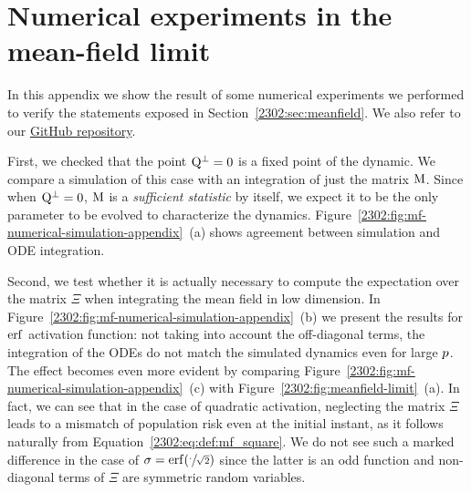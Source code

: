 \section{Numerical experiments in the mean-field limit}

\label{2302:sec:app:numerics-mean-field}
In this appendix we show the result of some numerical experiments we performed to verify the statements exposed in Section~\ref{2302:sec:meanfield}.  We also refer to our \href{https://github.com/IdePHICS/DimensionlessDynamicsSGD}{GitHub repository}.  

First, we checked that the point \(\mathrm{Q}^\bot = 0\) is a fixed point of the dynamic.
We compare a simulation of this case with an integration of just the matrix \(\mathrm{M}\). Since when \(\mathrm{Q}^\bot = 0\), \(\mathrm{M}\) is a \emph{sufficient statistic} by itself, we expect it to be the only parameter to be evolved to characterize the dynamics.
Figure~\ref{2302:fig:mf-numerical-simulation-appendix}~(a) shows agreement between simulation and ODE integration. 

Second, we test whether it is actually necessary to compute the expectation over the matrix \(\Xi\) when integrating the mean field in low dimension.
In Figure~\ref{2302:fig:mf-numerical-simulation-appendix}~(b) we present the results for \(\operatorname{erf}\) activation function: not taking into account the off-diagonal terms, the integration of the ODEs do not match the simulated dynamics even for large \(p\). 
The effect becomes even more evident by comparing  Figure~\ref{2302:fig:mf-numerical-simulation-appendix}~(c) with Figure~\ref{2302:fig:meanfield-limit}~(a). In fact, we can see that in the case of quadratic activation, neglecting the matrix \(\Xi\) leads to a mismatch of population risk even at the initial instant, as it follows naturally from Equation~\eqref{2302:eq:def:mf_square}.
We do not see such a marked difference in the case of \(\sigma=\operatorname{erf}(\sfrac{\cdot}{\sqrt2})\) since the latter is an odd function and non-diagonal terms of $\Xi$ are symmetric random variables.

